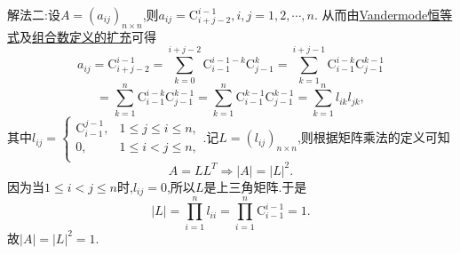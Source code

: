 \documentclass[../../main.tex]{subfiles}%
\begin{document}
\begin{solution}
{\color{blue}解法二:}设$A=(a_{ij})_{n\times n}$,则$a_{ij}=\mathrm{C}_{i+j-2}^{i-1} , i,j=1,2,\cdots,n$.
从而由\hyperref[theorem:Vandermode恒等式]{Vandermode恒等式}及\hyperref[Basis of Analytics-definition:组合数定义的扩充]{组合数定义的扩充}可得
\[
a_{ij}=\mathrm{C}_{i+j-2}^{i-1}=\sum_{k=0}^{i+j-2}{\mathrm{C}_{i-1}^{i-1-k}\mathrm{C}_{j-1}^{k}}=\sum_{k=1}^{i+j-1}{\mathrm{C}_{i-1}^{i-k}\mathrm{C}_{j-1}^{k-1}}
\]
\[
=\sum_{k=1}^n{\mathrm{C}_{i-1}^{i-k}\mathrm{C}_{j-1}^{k-1}}=\sum_{k=1}^n{\mathrm{C}_{i-1}^{k-1}\mathrm{C}_{j-1}^{k-1}}=\sum_{k=1}^n{l_{ik}l_{jk}},
\]
其中$l_{ij}=\begin{cases}
\mathrm{C}_{i-1}^{j-1}, & 1\leqslant j\leqslant i\leqslant n, \\
0, & 1\leqslant i<j\leqslant n, \\
\end{cases}$.记$L=\left( l_{ij} \right) _{n\times n}$,则根据矩阵乘法的定义可知
\[
A=LL^T\Rightarrow \left| A \right|=\left| L \right|^2.
\]
因为当$1\leqslant i<j\leqslant n$时,$l_{ij}=0$,所以$L$是上三角矩阵.于是
\[
\left| L \right|=\prod_{i=1}^n{l_{ii}}=\prod_{i=1}^n{\mathrm{C}_{i-1}^{i-1}}=1.
\]
故$\left| A \right|=\left| L \right|^2=1$.

\end{solution}
\end{document}
